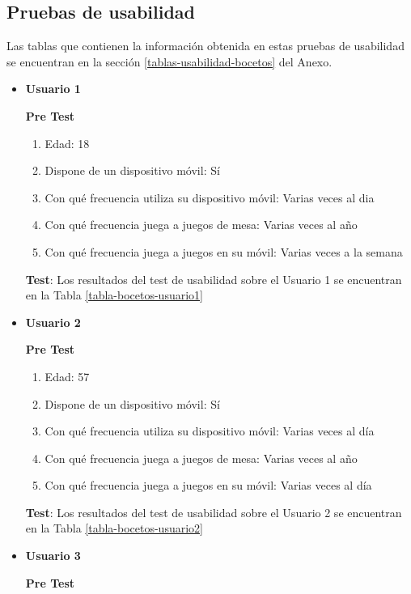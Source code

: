\subsection{Pruebas de usabilidad}
Las tablas que contienen la información obtenida en estas pruebas de usabilidad se encuentran en la sección \ref{tablas-usabilidad-bocetos} del Anexo.

\begin{itemize}
  \item \textbf{Usuario 1}

  \textbf{Pre Test}

  \begin{enumerate}
    \item Edad: 18
    \item Dispone de un dispositivo móvil: Sí
    \item Con qué frecuencia utiliza su dispositivo móvil: Varias veces al dia
    \item Con qué frecuencia juega a juegos de mesa: Varias veces al año
    \item Con qué frecuencia juega a juegos en su móvil: Varias veces a la semana
  \end{enumerate}

  \textbf{Test}: Los resultados del test de usabilidad sobre el Usuario 1 se encuentran en la Tabla \ref{tabla-bocetos-usuario1}


  \item \textbf{Usuario 2}

  \textbf{Pre Test}

  \begin{enumerate}
    \item Edad: 57
    \item Dispone de un dispositivo móvil: Sí
    \item Con qué frecuencia utiliza su dispositivo móvil: Varias veces al día
    \item Con qué frecuencia juega a juegos de mesa: Varias veces al año
    \item Con qué frecuencia juega a juegos en su móvil: Varias veces al día
  \end{enumerate}

  \textbf{Test}: Los resultados del test de usabilidad sobre el Usuario 2 se encuentran en la Tabla \ref{tabla-bocetos-usuario2}


  \item \textbf{Usuario 3}

  \textbf{Pre Test}


\end{itemize}
